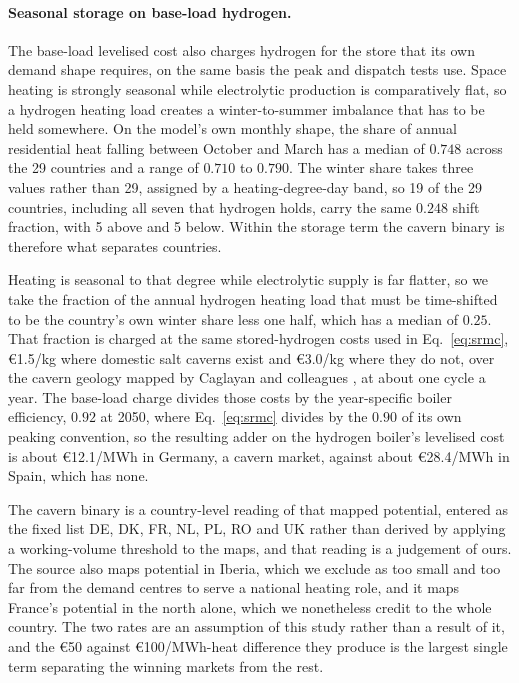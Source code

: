 \paragraph{Seasonal storage on base-load hydrogen.} The base-load levelised cost also
charges hydrogen for the store that its own demand shape requires, on the same basis the
peak and dispatch tests use. Space heating is strongly seasonal while electrolytic
production is comparatively flat, so a hydrogen heating load creates a winter-to-summer
imbalance that has to be held somewhere. On the model's own monthly shape, the share of
annual residential heat falling between October and March has a median of $0.748$ across
the 29 countries and a range of $0.710$ to $0.790$. The winter share takes three values
rather than 29, assigned by a heating-degree-day band, so 19 of the 29 countries,
including all seven that hydrogen holds, carry the same $0.248$ shift fraction, with 5
above and 5 below. Within the storage term the cavern binary is therefore what separates
countries.

Heating is seasonal to that degree while electrolytic supply is far flatter, so we take the fraction of the annual
hydrogen heating load that must be time-shifted to be the country's own winter share
less one half, which has a median of $0.25$. That fraction is charged at the same
stored-hydrogen costs used in Eq.~\eqref{eq:srmc}, \euro{}1.5/kg where domestic salt
caverns exist and \euro{}3.0/kg where they do not, over the cavern geology mapped by
Caglayan and colleagues \citep{Caglayan2020caverns}, at about
one cycle a year. The base-load charge divides those costs by the year-specific boiler
efficiency, $0.92$ at 2050, where Eq.~\eqref{eq:srmc} divides by the $0.90$ of its own
peaking convention, so the resulting adder on the hydrogen boiler's levelised cost is
about \euro{}12.1/MWh in Germany, a cavern market, against about \euro{}28.4/MWh in
Spain, which has none.

The cavern binary is a country-level reading of that mapped potential, entered as the
fixed list DE, DK, FR, NL, PL, RO and UK rather than derived by applying a
working-volume threshold to the maps, and that reading is a judgement of ours. The
source also maps potential in Iberia, which we exclude as too small and too far from
the demand centres to serve a national heating role, and it maps France's potential in
the north alone, which we nonetheless credit to the whole country. The two rates are an
assumption of this study rather than a result of it, and the \euro{}50 against
\euro{}100/MWh-heat difference they produce is the largest single term separating the
winning markets from the rest.

